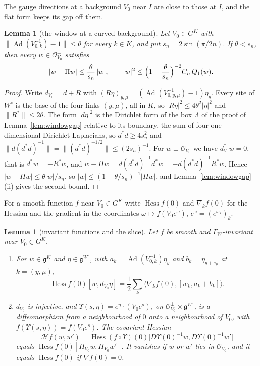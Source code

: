 \documentclass[11pt]{amsart}
\newtheorem{lemma}[theorem]{Lemma}
\theoremstyle{definition}
\theoremstyle{remark}
\numberwithin{equation}{section}
\newcommand{\g}{\mathfrak{g}}
\newcommand{\Hess}{\operatorname{Hess}}
\newcommand{\ip}[2]{\langle #1,#2\rangle}
\begin{document}
The gauge directions at a background $V_0$ near $I$ are close to those at
$I$, and the flat form keeps its gap off them.

\begin{lemma}[the window at a curved background]\label{lem:curvedwindow}
Let $V_0\in G^K$ with $\lVert\operatorname{Ad}(V_{0,k}^{-1})-1\rVert\le
\theta$ for every $k\in K$, and put $s_n=2\sin(\pi/2n)$. If $\theta<s_n$,
then every $w\in\mathcal O_{V_0}^\perp$ satisfies
\[
|w-\Pi w|\le\frac\theta{s_n}\,|w|,\qquad
|w|^2\le\Bigl(1-\frac\theta{s_n}\Bigr)^{-2}C_n\,Q_1(w).
\]
\end{lemma}

\begin{proof}
Write $d_{V_0}=d+R$ with $(R\eta)_{y,\mu}=(\operatorname{Ad}(V_{0,y,\mu}^{-1})
-1)\eta_y$. Every site of $W^\circ$ is the base of the four links $(y,\mu)$,
all in $K$, so $|R\eta|^2\le4\theta^2|\eta|^2$ and $\lVert R^*\rVert\le
2\theta$. The form $|d\eta|^2$ is the Dirichlet form of the box $\Lambda$ of
the proof of Lemma~\ref{lem:windowgap} relative to its boundary, the sum of
four one-dimensional Dirichlet Laplacians, so $d^*d\ge4s_n^2$ and
$\lVert d(d^*d)^{-1}\rVert=\lVert(d^*d)^{-1/2}\rVert\le(2s_n)^{-1}$. For
$w\perp\mathcal O_{V_0}$ we have $d_{V_0}^*w=0$, that is $d^*w=-R^*w$, and
$w-\Pi w=d(d^*d)^{-1}d^*w=-d(d^*d)^{-1}R^*w$. Hence $|w-\Pi w|\le
\theta|w|/s_n$, so $|w|\le(1-\theta/s_n)^{-1}|\Pi w|$, and
Lemma~\ref{lem:windowgap}(ii) gives the second bound.
\end{proof}

For a smooth function $f$ near $V_0\in G^K$ write $\Hess f(0)$ and $\nabla_k
f(0)$ for the Hessian and the gradient in the coordinates $\omega\mapsto f(
V_0e^\omega)$, $e^\omega=(e^{\omega_k})_k$.

\begin{lemma}[invariant functions and the slice]\label{lem:invariantslice}
Let $f$ be smooth and $\Gamma_W$-invariant near $V_0\in G^K$.
\begin{enumerate}[label=\textup{(\roman*)},leftmargin=*]
\item For $w\in\g^K$ and $\eta\in\g^{W^\circ}$, with $a_k=\operatorname{Ad}
(V_{0,k}^{-1})\eta_y$ and $b_k=\eta_{y+e_\mu}$ at $k=(y,\mu)$,
\[
\Hess f(0)[w,d_{V_0}\eta]=\frac12\sum_k\ip{\nabla_kf(0)}{[w_k,a_k+b_k]}.
\]
\item $d_{V_0}$ is injective, and $\Upsilon(s,\eta)=e^\eta\cdot(V_0e^s)$, on
$\mathcal O_{V_0}^\perp\times\g^{W^\circ}$, is a diffeomorphism from a
neighbourhood of $0$ onto a neighbourhood of $V_0$, with $f(\Upsilon(s,
\eta))=f(V_0e^s)$. The \emph{covariant Hessian}
\[
\mathcal Hf(w,w')=\Hess(f\circ\Upsilon)(0)\bigl[D\Upsilon(0)^{-1}w,
D\Upsilon(0)^{-1}w'\bigr]
\]
equals $\Hess f(0)[\Pi_{V_0}w,\Pi_{V_0}w']$. It vanishes if $w$ or $w'$
lies in $\mathcal O_{V_0}$, and it equals $\Hess f(0)$ if $\nabla f(0)=0$.
\end{enumerate}
\end{lemma}
\end{document}
